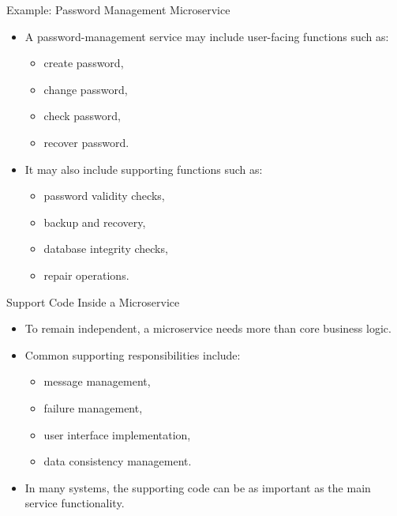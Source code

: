 \begin{frame}{Example: Password Management Microservice}
\begin{itemize}
    \item A password-management service may include user-facing functions such as:
    \begin{itemize}
        \item create password,
        \item change password,
        \item check password,
        \item recover password.
    \end{itemize}
    \item It may also include supporting functions such as:
    \begin{itemize}
        \item password validity checks,
        \item backup and recovery,
        \item database integrity checks,
        \item repair operations.
    \end{itemize}
\end{itemize}
\end{frame}

\begin{frame}{Support Code Inside a Microservice}
\begin{itemize}
    \item To remain independent, a microservice needs more than core business logic.
    \item Common supporting responsibilities include:
    \begin{itemize}
        \item message management,
        \item failure management,
        \item user interface implementation,
        \item data consistency management.
    \end{itemize}
    \item In many systems, the supporting code can be as important as the main service functionality.
\end{itemize}
\end{frame}

